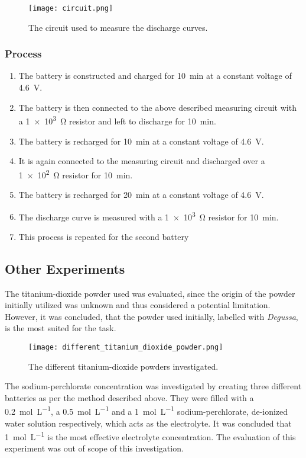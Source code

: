 \begin{figure}[ht!]
\centering
\texttt{[image: circuit.png]}
\caption{The circuit used to measure the discharge curves.}
\label{fig:circuitfig}
\end{figure}

\newpage
    
\subsubsection{Process}
\begin{enumerate}
\item The battery is constructed and charged for \SI{10}{\minute} at a constant voltage of \SI{4.6}{\volt}.
\item The battery is then connected to the above described measuring circuit with a \SI{1e3}{\ohm} resistor and left to discharge for \SI{10}{\minute}.
\item The battery is recharged for \SI{10}{\minute} at a constant voltage of \SI{4.6}{\volt}.
\item It is again connected to the measuring circuit and discharged over a \SI{1e2}{\ohm} resistor for \SI{10}{\minute}.
\item The battery is recharged for \SI{20}{\minute} at a constant voltage of \SI{4.6}{\volt}.
\item The discharge curve is measured with a \SI{1e3}{\ohm} resistor for \SI{10}{\minute}.
\item This process is repeated for the second battery
\end{enumerate}

\subsection{Other Experiments}
The titanium-dioxide powder used was evaluated, since the origin of the powder initially utilized was unknown and thus considered a potential limitation. However, it was concluded, that the powder used initially, labelled with \textit{Degussa}, is the most suited for the task.

\begin{figure}[ht!]
\centering
\texttt{[image: different\_titanium\_dioxide\_powder.png]}
\caption{The different titanium-dioxide powders investigated.}
\label{fig:otherexp}
\end{figure}

The sodium-perchlorate concentration was investigated by creating three different batteries as per the method described above. They were filled with a \SI{0.2}{\mol\per\L}, a \SI{0.5}{\mol\per\L} and a \SI{1}{\mol\per\L} sodium-perchlorate, de-ionized water solution respectively, which acts as the electrolyte. It was concluded that \SI{1}{\mol\per\L} is the most effective electrolyte concentration. The evaluation of this experiment was out of scope of this investigation.

